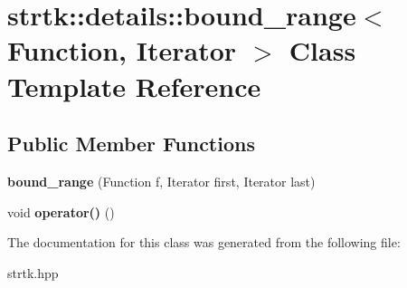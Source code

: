 \hypertarget{classstrtk_1_1details_1_1bound__range}{\section{strtk\-:\-:details\-:\-:bound\-\_\-range$<$ Function, Iterator $>$ Class Template Reference}
\label{classstrtk_1_1details_1_1bound__range}
}
\subsection*{Public Member Functions}
\begin{DoxyCompactItemize}
\item 
\hypertarget{classstrtk_1_1details_1_1bound__range_a57457127d4beb91ed39b31b31ca21fa8}{{\bfseries bound\-\_\-range} (Function f, Iterator first, Iterator last)}\label{classstrtk_1_1details_1_1bound__range_a57457127d4beb91ed39b31b31ca21fa8}

\item 
\hypertarget{classstrtk_1_1details_1_1bound__range_a384a67fa05d11fb882836d49c36f36cd}{void {\bfseries operator()} ()}\label{classstrtk_1_1details_1_1bound__range_a384a67fa05d11fb882836d49c36f36cd}

\end{DoxyCompactItemize}


The documentation for this class was generated from the following file\-:\begin{DoxyCompactItemize}
\item 
strtk.\-hpp\end{DoxyCompactItemize}
